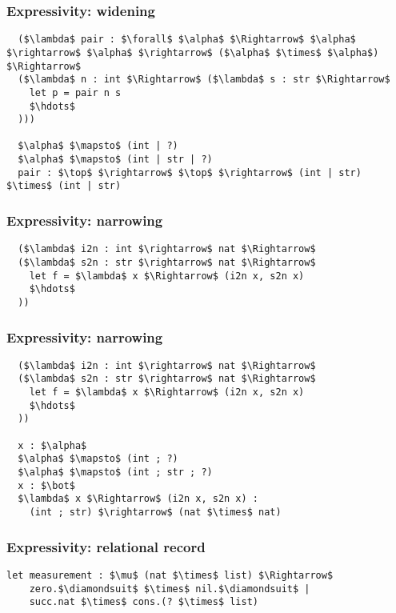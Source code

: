 \documentclass{beamer}
\begin{document}
\begin{frame}[fragile]
  \frametitle{Expressivity: widening}

  \begin{lstlisting}
  ($\lambda$ pair : $\forall$ $\alpha$ $\Rightarrow$ $\alpha$ $\rightarrow$ $\alpha$ $\rightarrow$ ($\alpha$ $\times$ $\alpha$) $\Rightarrow$ 
  ($\lambda$ n : int $\Rightarrow$ ($\lambda$ s : str $\Rightarrow$ 
    let p = pair n s
    $\hdots$
  )))

  $\alpha$ $\mapsto$ (int | ?) 
  $\alpha$ $\mapsto$ (int | str | ?)
  pair : $\top$ $\rightarrow$ $\top$ $\rightarrow$ (int | str) $\times$ (int | str)

  \end{lstlisting}
\end{frame}


\begin{frame}[fragile]
  \frametitle{Expressivity: narrowing}

  \begin{lstlisting}
  ($\lambda$ i2n : int $\rightarrow$ nat $\Rightarrow$ 
  ($\lambda$ s2n : str $\rightarrow$ nat $\Rightarrow$ 
    let f = $\lambda$ x $\Rightarrow$ (i2n x, s2n x)
    $\hdots$
  ))
  \end{lstlisting}
\end{frame}

\begin{frame}[fragile]
  \frametitle{Expressivity: narrowing}

  \begin{lstlisting}
  ($\lambda$ i2n : int $\rightarrow$ nat $\Rightarrow$ 
  ($\lambda$ s2n : str $\rightarrow$ nat $\Rightarrow$ 
    let f = $\lambda$ x $\Rightarrow$ (i2n x, s2n x)
    $\hdots$
  ))
  
  x : $\alpha$
  $\alpha$ $\mapsto$ (int ; ?)
  $\alpha$ $\mapsto$ (int ; str ; ?)
  x : $\bot$
  $\lambda$ x $\Rightarrow$ (i2n x, s2n x) : 
    (int ; str) $\rightarrow$ (nat $\times$ nat) 
  \end{lstlisting}
\end{frame}

\begin{frame}[fragile]
  \frametitle{Expressivity: relational record}

  \begin{lstlisting}[]
  let measurement : $\mu$ (nat $\times$ list) $\Rightarrow$ 
    zero.$\diamondsuit$ $\times$ nil.$\diamondsuit$ | 
    succ.nat $\times$ cons.(? $\times$ list)
  \end{lstlisting} 

\end{frame}
\end{document}
